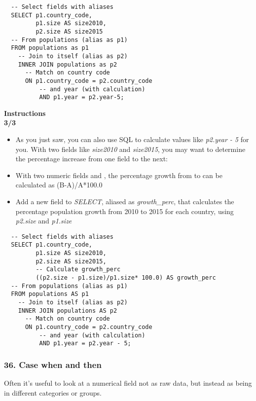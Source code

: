 \documentclass[
]{article}
\begin{document}
\begin{verbatim}
  -- Select fields with aliases
  SELECT p1.country_code,
         p1.size AS size2010,
         p2.size AS size2015
  -- From populations (alias as p1)
  FROM populations as p1
    -- Join to itself (alias as p2)
    INNER JOIN populations as p2
      -- Match on country code
      ON p1.country_code = p2.country_code
          -- and year (with calculation)
          AND p1.year = p2.year-5;
\end{verbatim}

\textbf{Instructions}\\
\textbf{3/3}

\begin{itemize}
\item
  As you just saw, you can also use SQL to calculate values like
  \emph{p2.year - 5} for you. With two fields like \emph{size2010} and
  \emph{size2015}, you may want to determine the percentage increase
  from one field to the next:
\item
  With two numeric fields and , the percentage growth from to can be
  calculated as (B-A)/A*100.0
\item
  Add a new field to \emph{SELECT}, aliased as \emph{growth\_perc}, that
  calculates the percentage population growth from 2010 to 2015 for each
  country, using \emph{p2.size} and \emph{p1.size}
\end{itemize}

\begin{verbatim}
  -- Select fields with aliases
  SELECT p1.country_code,
         p1.size AS size2010, 
         p2.size AS size2015,
         -- Calculate growth_perc
         ((p2.size - p1.size)/p1.size* 100.0) AS growth_perc
  -- From populations (alias as p1)
  FROM populations AS p1
    -- Join to itself (alias as p2)
    INNER JOIN populations AS p2
      -- Match on country code
      ON p1.country_code = p2.country_code
          -- and year (with calculation)
          AND p1.year = p2.year - 5;
\end{verbatim}

\hypertarget{case-when-and-then}{%
\subsubsection{36. Case when and then}\label{case-when-and-then}}

Often it's useful to look at a numerical field not as raw data, but
instead as being in different categories or groups.
\end{document}
